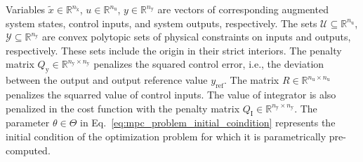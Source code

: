 \documentclass[preprint,12pt]{elsarticle}
\begin{document}
	Variables $\widetilde{x} \in \mathbb{R}^{n_{\widetilde{\mathrm{x}}}}$, $u \in \mathbb{R}^{n_{\mathrm{u}}}$, $y \in \mathbb{R}^{n_{\mathrm{y}}}$ are vectors of corresponding augmented system states, control inputs, and system outputs, respectively. 
	The sets $\mathcal{U} \subseteq \mathbb{R}^{n_{\mathrm{u}}}$, $\mathcal{Y} \subseteq \mathbb{R}^{n_{\mathrm{y}}}$ are convex polytopic sets of physical constraints on inputs and outputs, respectively. These sets include the origin in their strict interiors. The penalty matrix $Q_\mathrm{y} \in \mathbb{R}^{n_{\mathrm{y}} \times n_{\mathrm{y}}}$ penalizes the squared control error, i.e., the deviation between the output and output reference value $y_\mathrm{ref}$. The matrix $R \in \mathbb{R}^{n_{\mathrm{u}} \times n_{\mathrm{u}}}$ penalizes the squarred value of control inputs. 
	The value of integrator is also penalized in the cost function with the penalty matrix $Q_\mathrm{I} \in \mathbb{R}^{n_{\mathrm{y}} \times n_{\mathrm{y}}}$. 
	The parameter $\theta \in \Theta$ in Eq.~\eqref{eq:mpc_problem_initial_coindition} represents the initial condition of the optimization problem for which it is parametrically pre-computed. 
	
\end{document}

